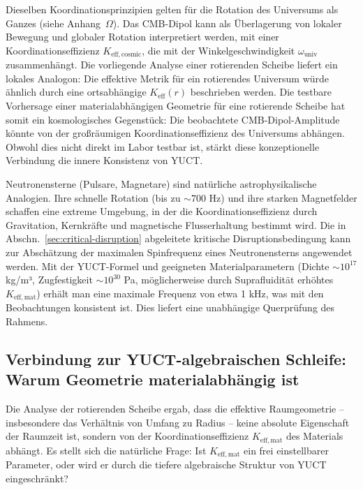 \documentclass[12pt,a4paper]{article}
\begin{document}
	Dieselben Koordinationsprinzipien gelten für die Rotation des Universums als Ganzes (siehe Anhang~\(\Omega\)). Das CMB-Dipol kann als Überlagerung von lokaler Bewegung und globaler Rotation interpretiert werden, mit einer Koordinationseffizienz \(K_{\mathrm{eff,cosmic}}\), die mit der Winkelgeschwindigkeit \(\omega_{\text{univ}}\) zusammenhängt. Die vorliegende Analyse einer rotierenden Scheibe liefert ein lokales Analogon: Die effektive Metrik für ein rotierendes Universum würde ähnlich durch eine ortsabhängige \(K_{\mathrm{eff}}(r)\) beschrieben werden. Die testbare Vorhersage einer materialabhängigen Geometrie für eine rotierende Scheibe hat somit ein kosmologisches Gegenstück: Die beobachtete CMB-Dipol-Amplitude könnte von der großräumigen Koordinationseffizienz des Universums abhängen. Obwohl dies nicht direkt im Labor testbar ist, stärkt diese konzeptionelle Verbindung die innere Konsistenz von YUCT.
	
	Neutronensterne (Pulsare, Magnetare) sind natürliche astrophysikalische Analogien. Ihre schnelle Rotation (bis zu \(\sim 700\) Hz) und ihre starken Magnetfelder schaffen eine extreme Umgebung, in der die Koordinationseffizienz durch Gravitation, Kernkräfte und magnetische Flusserhaltung bestimmt wird. Die in Abschn.~\ref{sec:critical-disruption} abgeleitete kritische Disruptionsbedingung kann zur Abschätzung der maximalen Spinfrequenz eines Neutronensterns angewendet werden. Mit der YUCT-Formel und geeigneten Materialparametern (Dichte \(\sim 10^{17}\) kg/m³, Zugfestigkeit \(\sim 10^{30}\) Pa, möglicherweise durch Suprafluidität erhöhtes \(K_{\mathrm{eff,mat}}\)) erhält man eine maximale Frequenz von etwa 1 kHz, was mit den Beobachtungen konsistent ist. Dies liefert eine unabhängige Querprüfung des Rahmens.
	
	\subsection{Verbindung zur YUCT-algebraischen Schleife: Warum Geometrie materialabhängig ist}
	\label{subsec:ehrenfest-algebraic-loop}
	
	Die Analyse der rotierenden Scheibe ergab, dass die effektive Raumgeometrie – insbesondere das Verhältnis von Umfang zu Radius – keine absolute Eigenschaft der Raumzeit ist, sondern von der Koordinationseffizienz \(K_{\mathrm{eff,mat}}\) des Materials abhängt. Es stellt sich die natürliche Frage: Ist \(K_{\mathrm{eff,mat}}\) ein frei einstellbarer Parameter, oder wird er durch die tiefere algebraische Struktur von YUCT eingeschränkt?
	
\end{document}

